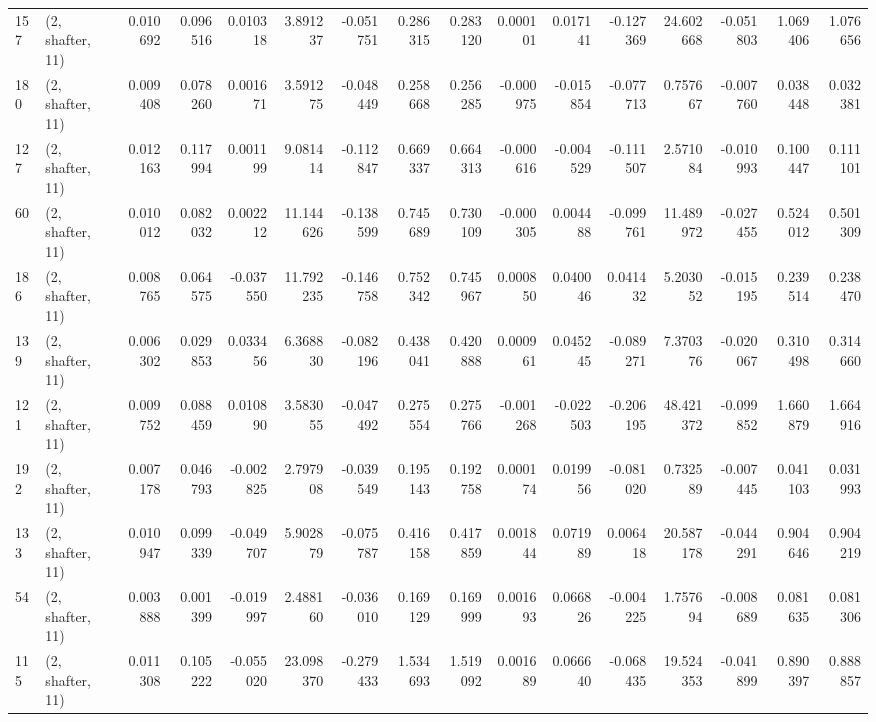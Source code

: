 \begin{tabular}{llrrrrrrrrrrrrrr}
157 &  (2, shafter, 11) &   0.010692 &  0.096516 &  0.010318 &   3.891237 & -0.051751 &   0.286315 &  0.283120 &  0.000101 &  0.017141 & -0.127369 &    24.602668 &  -0.051803 &   1.069406 &   1.076656 \\
180 &  (2, shafter, 11) &   0.009408 &  0.078260 &  0.001671 &   3.591275 & -0.048449 &   0.258668 &  0.256285 & -0.000975 & -0.015854 & -0.077713 &     0.757667 &  -0.007760 &   0.038448 &   0.032381 \\
127 &  (2, shafter, 11) &   0.012163 &  0.117994 &  0.001199 &   9.081414 & -0.112847 &   0.669337 &  0.664313 & -0.000616 & -0.004529 & -0.111507 &     2.571084 &  -0.010993 &   0.100447 &   0.111101 \\
60  &  (2, shafter, 11) &   0.010012 &  0.082032 &  0.002212 &  11.144626 & -0.138599 &   0.745689 &  0.730109 & -0.000305 &  0.004488 & -0.099761 &    11.489972 &  -0.027455 &   0.524012 &   0.501309 \\
186 &  (2, shafter, 11) &   0.008765 &  0.064575 & -0.037550 &  11.792235 & -0.146758 &   0.752342 &  0.745967 &  0.000850 &  0.040046 &  0.041432 &     5.203052 &  -0.015195 &   0.239514 &   0.238470 \\
139 &  (2, shafter, 11) &   0.006302 &  0.029853 &  0.033456 &   6.368830 & -0.082196 &   0.438041 &  0.420888 &  0.000961 &  0.045245 & -0.089271 &     7.370376 &  -0.020067 &   0.310498 &   0.314660 \\
121 &  (2, shafter, 11) &   0.009752 &  0.088459 &  0.010890 &   3.583055 & -0.047492 &   0.275554 &  0.275766 & -0.001268 & -0.022503 & -0.206195 &    48.421372 &  -0.099852 &   1.660879 &   1.664916 \\
192 &  (2, shafter, 11) &   0.007178 &  0.046793 & -0.002825 &   2.797908 & -0.039549 &   0.195143 &  0.192758 &  0.000174 &  0.019956 & -0.081020 &     0.732589 &  -0.007445 &   0.041103 &   0.031993 \\
133 &  (2, shafter, 11) &   0.010947 &  0.099339 & -0.049707 &   5.902879 & -0.075787 &   0.416158 &  0.417859 &  0.001844 &  0.071989 &  0.006418 &    20.587178 &  -0.044291 &   0.904646 &   0.904219 \\
54  &  (2, shafter, 11) &   0.003888 &  0.001399 & -0.019997 &   2.488160 & -0.036010 &   0.169129 &  0.169999 &  0.001693 &  0.066826 & -0.004225 &     1.757694 &  -0.008689 &   0.081635 &   0.081306 \\
115 &  (2, shafter, 11) &   0.011308 &  0.105222 & -0.055020 &  23.098370 & -0.279433 &   1.534693 &  1.519092 &  0.001689 &  0.066640 & -0.068435 &    19.524353 &  -0.041899 &   0.890397 &   0.888857 \\

\end{tabular}
